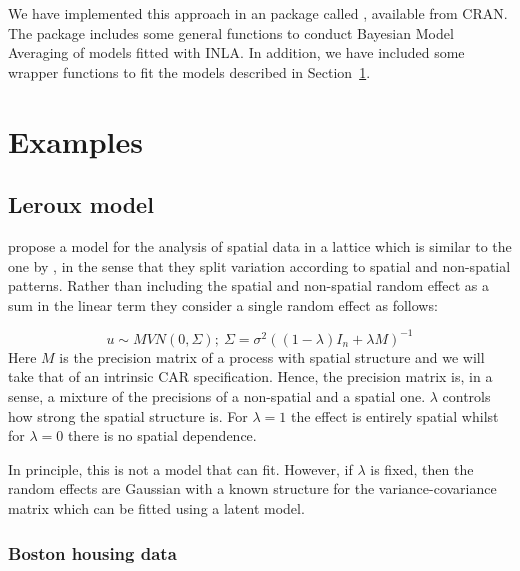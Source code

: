 \documentclass[article]{jss}
\begin{document}
We have implemented this approach in an  package called ,
available from CRAN.
The package includes some
general functions to conduct Bayesian Model Averaging of models fitted with
INLA. In addition, we have included some wrapper functions to fit the models
described in Section~\ref{sec:examples}.


\section{Examples}
\label{sec:examples}

\subsection{Leroux model}

\citet{Lerouxetal:1999} propose a model for the analysis of spatial data in a
lattice which is similar to the one by \citet{besagetal:1991}, in the sense
that they split variation according to  spatial and non-spatial patterns.
Rather than including the spatial and non-spatial random effect as a sum in the
linear term they consider a single random effect as follows:

\begin{equation}
u \sim MVN(0, \Sigma);\ \Sigma=\sigma^2 ((1-\lambda) I_n+\lambda M)^{-1}
\label{eq:leroux}
\end{equation}
\noindent
Here $M$ is the precision matrix of a process with spatial structure and we
will take that of an intrinsic CAR specification. Hence, the precision matrix
is, in a sense, a mixture of the precisions of a non-spatial and a spatial
one. $\lambda$ controls how strong the spatial structure is. For $\lambda=1$
the effect is entirely spatial whilst for $\lambda=0$ there is no spatial
dependence.

In principle, this is not a model that  can fit. However, if
$\lambda$ is fixed, then the random effects are Gaussian with a known structure
for the variance-covariance matrix which can be fitted using a 
latent model.

\subsubsection{Boston housing data}
\end{document}
